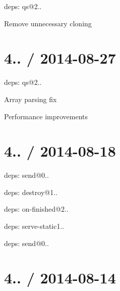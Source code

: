 {\ttfamily }

{\ttfamily 
\begin{DoxyItemize}
\item deps\+: qs@2..
\begin{DoxyItemize}
\item Remove unnecessary cloning
\end{DoxyItemize}
\end{DoxyItemize}}

{\ttfamily \section*{4.. / 2014-\/08-\/27 }}

{\ttfamily }

{\ttfamily 
\begin{DoxyItemize}
\item deps\+: qs@2..
\begin{DoxyItemize}
\item Array parsing fix
\item Performance improvements
\end{DoxyItemize}
\end{DoxyItemize}}

{\ttfamily \section*{4.. / 2014-\/08-\/18 }}

{\ttfamily }

{\ttfamily 
\begin{DoxyItemize}
\item deps\+: send@0..
\begin{DoxyItemize}
\item deps\+: destroy@1..
\item deps\+: on-\/finished@2..
\end{DoxyItemize}
\item deps\+: serve-\/static1..
\begin{DoxyItemize}
\item deps\+: send@0..
\end{DoxyItemize}
\end{DoxyItemize}}

{\ttfamily \section*{4.. / 2014-\/08-\/14 }}

